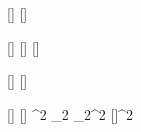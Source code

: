 

\varDef{\angleTwo}{\beta}
\varDef{\angleOne}{\alpha}
\varDef{\angleFour}{\Pi}
\varDef{\angleThree}{\Gamma}

[\mathbb]
[\mathbb]

[\mathcal]
[\mathcal]
[\mathbb]

[\mathcal]
[\mathcal]

[\vectorFmt]
[\unitVecFmt]
^{2}
_{2}
_{2}^{2}
[\vectorFmt]^{2}


